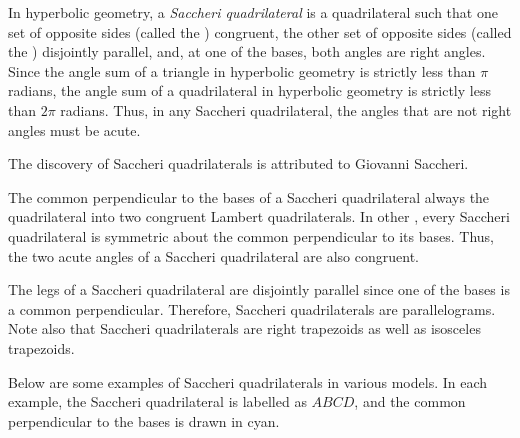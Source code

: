 \documentclass[12pt]{article}
\begin{document}

In hyperbolic geometry, a \emph{Saccheri quadrilateral} is a quadrilateral such that one set of opposite sides (called the ) congruent, the other set of opposite sides (called the ) disjointly parallel, and, at one of the bases, both angles are right angles.  Since the angle sum of a triangle in hyperbolic geometry is strictly less than $\pi$ radians, the angle sum of a quadrilateral in hyperbolic geometry is strictly less than $2\pi$ radians. Thus, in any Saccheri quadrilateral, the angles that are not right angles must be acute.

The discovery of Saccheri quadrilaterals is attributed to Giovanni Saccheri.

The common perpendicular to the bases of a Saccheri quadrilateral always  the quadrilateral into two congruent Lambert quadrilaterals.  In other , every Saccheri quadrilateral is symmetric about the common perpendicular to its bases.  Thus, the two acute angles of a Saccheri quadrilateral are also congruent.

The legs of a Saccheri quadrilateral are disjointly parallel since one of the bases is a common perpendicular.  Therefore, Saccheri quadrilaterals are parallelograms.  Note also that Saccheri quadrilaterals are right trapezoids as well as isosceles trapezoids.

Below are some examples of Saccheri quadrilaterals in various models.  In each example, the Saccheri quadrilateral is labelled as $ABCD$, and the common perpendicular to the bases is drawn in cyan.
\end{document}
